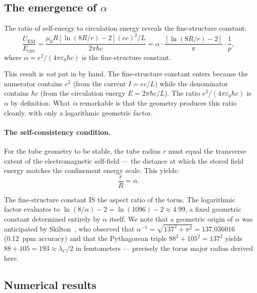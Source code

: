 \documentclass[11pt,a4paper]{article}
\begin{document}
\subsection{The emergence of \texorpdfstring{$\alpha$}{alpha}}

The ratio of self-energy to circulation energy reveals the fine-structure constant:
\begin{equation}
  \frac{U_{\text{EM}}}{E_{\text{circ}}} = \frac{\mu_0 R[\ln(8R/r) - 2](ec)^2/L}{2\pi\hbar c} = \alpha\cdot\frac{[\ln(8R/r) - 2]}{\pi} \cdot \frac{1}{p},
  \label{eq:ratio-alpha}
\end{equation}
where $\alpha = e^2/(4\pi\varepsilon_0\hbar c)$ is the fine-structure constant.

This result is \emph{not} put in by hand. The fine-structure constant enters because the numerator contains $e^2$ (from the current $I = ec/L$) while the denominator contains $\hbar c$ (from the circulation energy $E = 2\pi\hbar c/L$). The ratio $e^2/(4\pi\varepsilon_0\hbar c)$ is $\alpha$ by definition. What \emph{is} remarkable is that the geometry produces this ratio cleanly, with only a logarithmic geometric factor.

\paragraph{The self-consistency condition.}
For the tube geometry to be stable, the tube radius $r$ must equal the transverse extent of the electromagnetic self-field --- the distance at which the stored field energy matches the confinement energy scale. This yields:
\begin{equation}
  \frac{r}{R} = \alpha.
  \label{eq:aspect-ratio}
\end{equation}

The fine-structure constant IS the aspect ratio of the torus. The logarithmic factor evaluates to $\ln(8/\alpha) - 2 = \ln(1096) - 2 \approx 4.99$, a fixed geometric constant determined entirely by $\alpha$ itself. We note that a geometric origin of $\alpha$ was anticipated by Skilton~\cite{skilton1988}, who observed that $\alpha^{-1} = \sqrt{137^2 + \pi^2} = 137.036016$ (0.12~ppm accuracy) and that the Pythagorean triple $88^2 + 105^2 = 137^2$ yields $88 + 105 = 193 \approx \lambda_C/2$ in femtometers --- precisely the torus major radius derived here.

\subsection{Numerical results}
\end{document}
